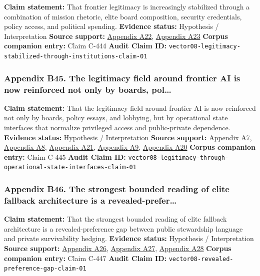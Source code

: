 \documentclass[
  american,
  11pt,
  letterpaper,
]{article}
\begin{document}
\textbf{Claim statement:} That frontier legitimacy is increasingly
stabilized through a combination of mission rhetoric, elite board
composition, security credentials, policy access, and political
spending. \textbf{Evidence status:} Hypothesis / Interpretation
\textbf{Source support:}
\hyperref[ch-10-appendix-a22-anthropic-outspends-openai-in-biggest-ever-lobbying-quarter]{Appendix
A22},
\hyperref[ch-10-appendix-a23-leading-the-future-committee-overview]{Appendix
A23} \textbf{Corpus companion entry:} Claim C-444 \textbf{Audit Claim
ID:}
\texttt{vector08-legitimacy-stabilized-through-institutions-claim-01}

\subsubsection{Appendix B45. The legitimacy field around frontier AI is
now reinforced not only by boards,
pol\ldots{}}\label{ch-10-appendix-b45-the-legitimacy-field-around-frontier-ai-is-now-reinforced-not-only-by-boards-pol}

\textbf{Claim statement:} That the legitimacy field around frontier AI
is now reinforced not only by boards, policy essays, and lobbying, but
by operational state interfaces that normalize privileged access and
public-private dependence. \textbf{Evidence status:} Hypothesis /
Interpretation \textbf{Source support:}
\hyperref[ch-10-appendix-a7-introducing-openai-for-government]{Appendix
A7},
\hyperref[ch-10-appendix-a8-claude-gov-models-for-u-s-national-security-customers]{Appendix
A8},
\hyperref[ch-10-appendix-a21-anthropic-and-palantir-partner-to-bring-claude-ai-models-to-aws-for-u-s-government-intelligence-and-defense-operations]{Appendix
A21},
\hyperref[ch-10-appendix-a9-army-launches-detachment-201-executive-innovation-corps-to-drive-tech-transformation]{Appendix
A9},
\hyperref[ch-10-appendix-a20-openais-proposals-for-the-us-ai-action-plan]{Appendix
A20} \textbf{Corpus companion entry:} Claim C-445 \textbf{Audit Claim
ID:}
\texttt{vector08-legitimacy-through-operational-state-interfaces-claim-01}

\subsubsection{Appendix B46. The strongest bounded reading of elite
fallback architecture is a
revealed-prefer\ldots{}}\label{ch-10-appendix-b46-the-strongest-bounded-reading-of-elite-fallback-architecture-is-a-revealed-prefer}

\textbf{Claim statement:} That the strongest bounded reading of elite
fallback architecture is a revealed-preference gap between public
stewardship language and private survivability hedging. \textbf{Evidence
status:} Hypothesis / Interpretation \textbf{Source support:}
\hyperref[ch-10-appendix-a26-sam-altman-s-manifest-destiny]{Appendix
A26},
\hyperref[ch-10-appendix-a27-inside-mark-zuckerbergs-top-secret-hawaii-compound]{Appendix
A27},
\hyperref[ch-10-appendix-a28-new-zealand-woos-the-wealthy-with-golden-visa-changes]{Appendix
A28} \textbf{Corpus companion entry:} Claim C-447 \textbf{Audit Claim
ID:} \texttt{vector08-revealed-preference-gap-claim-01}
\end{document}
